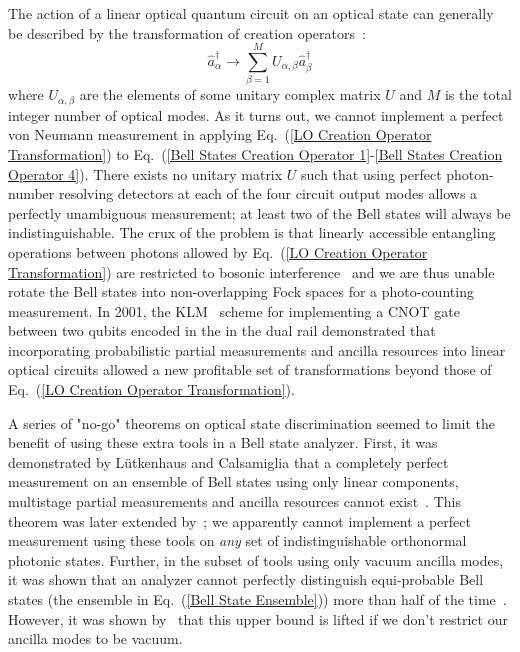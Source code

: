 \documentclass[aps,pra,twocolumn,showpacs,superscriptaddress,floatfix,10pt]{revtex4}
\begin{document}
The action of a linear optical quantum circuit on an optical state can generally be described by the transformation of creation operators~\cite{Review Paper,Reck}:
\begin{equation}
\label{LO Creation Operator Transformation}
\hat{a}^\dagger_\alpha \rightarrow \sum_{\beta=1}^{M} U_{\alpha,\beta} \hat{a}^\dagger_\beta
\end{equation}
where $U_{\alpha,\beta}$ are the elements of some unitary complex matrix $U$ and $M$ is the total integer number of optical modes. As it turns out, we cannot implement a perfect von Neumann measurement in applying Eq.~(\ref{LO Creation Operator Transformation}) to Eq.~(\ref{Bell States Creation Operator 1}-\ref{Bell States Creation Operator 4}). There exists no unitary matrix $U$ such that using perfect photon-number resolving detectors at each of the four circuit output modes allows a perfectly unambiguous measurement; at least two of the Bell states will always be indistinguishable. The crux of the problem is that linearly accessible entangling operations between photons allowed by Eq.~(\ref{LO Creation Operator Transformation}) are restricted to bosonic interference~\cite{Review Paper} and we are thus unable rotate the Bell states into non-overlapping Fock spaces for a photo-counting measurement. In 2001, the KLM~\cite{KLM,KLM2} scheme for implementing a CNOT gate between two qubits encoded in the in the dual rail demonstrated that incorporating probabilistic partial measurements and ancilla resources into linear optical circuits allowed a new profitable set of transformations beyond those of Eq.~(\ref{LO Creation Operator Transformation}). 

A series of "no-go" theorems on optical state discrimination seemed to limit the benefit of using these extra tools in a Bell state analyzer. First, it was demonstrated by L\"utkenhaus and Calsamiglia that a completely perfect measurement on an ensemble of Bell states using only linear components, multistage partial measurements and ancilla resources cannot exist~\cite{Lutkenhaus}. This theorem was later extended by~\cite{Carollo}; we apparently cannot implement a perfect measurement using these tools on \textit{any} set of indistinguishable orthonormal photonic states. Further, in the subset of tools using only vacuum ancilla modes, it was shown that an analyzer cannot perfectly distinguish equi-probable Bell states (the ensemble in Eq.~(\ref{Bell State Ensemble})) more than half of the time~\cite{Calsamiglia}. However, it was shown by~\cite{Ewert} that this upper bound is lifted if we don't restrict our ancilla modes to be vacuum.
\end{document}
